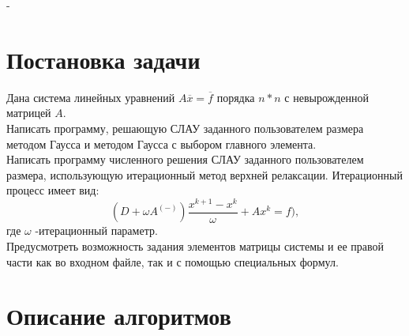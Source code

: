 \documentclass[a4paper,12pt,titlepage,finall]{article}
\begin{document}
\newpage
-
\section{Постановка задачи}

Дана система линейных уравнений $A\overline{x}=\overline{f}$  порядка $n * n$ с невырожденной матрицей $A$. \\
Написать программу, решающую СЛАУ заданного пользователем размера методом Гаусса и методом Гаусса с выбором главного элемента.\\
Написать программу численного решения СЛАУ заданного пользователем размера, использующую
итерационный метод верхней релаксации. Итерационный процесс имеет вид:
$$ (D + \omega A ^ {(-)}) \frac{x^{k+1}-x^{k}}{\omega} + Ax^{k} = f),$$
где $\omega$ -итерационный параметр.\\
Предусмотреть возможность задания элементов матрицы системы и ее правой части как во входном файле, так и с помощью специальных формул.

\newpage


\section{Описание алгоритмов}
\end{document}
